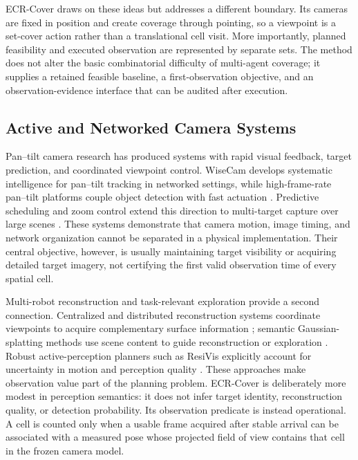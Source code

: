 ECR-Cover draws on these ideas but addresses a different boundary. Its cameras are fixed in position and create coverage through pointing, so a viewpoint is a set-cover action rather than a translational cell visit. More importantly, planned feasibility and executed observation are represented by separate sets. The method does not alter the basic combinatorial difficulty of multi-agent coverage; it supplies a retained feasible baseline, a first-observation objective, and an observation-evidence interface that can be audited after execution.

\subsection{Active and Networked Camera Systems}

Pan--tilt camera research has produced systems with rapid visual feedback, target prediction, and coordinated viewpoint control. WiseCam develops systematic intelligence for pan--tilt tracking in networked settings, while high-frame-rate pan--tilt platforms couple object detection with fast actuation \cite{e2024wisecam,jiang2021pan}. Predictive scheduling and zoom control extend this direction to multi-target capture over large scenes \cite{zhang2026capture}. These systems demonstrate that camera motion, image timing, and network organization cannot be separated in a physical implementation. Their central objective, however, is usually maintaining target visibility or acquiring detailed target imagery, not certifying the first valid observation time of every spatial cell.

Multi-robot reconstruction and task-relevant exploration provide a second connection. Centralized and distributed reconstruction systems coordinate viewpoints to acquire complementary surface information \cite{hardouin2023reconstruction}; semantic Gaussian-splatting methods use scene content to guide reconstruction or exploration \cite{zeng2025multirobot,nagami2026vista}. Robust active-perception planners such as ResiVis explicitly account for uncertainty in motion and perception quality \cite{xanthidis2024resivis}. These approaches make observation value part of the planning problem. ECR-Cover is deliberately more modest in perception semantics: it does not infer target identity, reconstruction quality, or detection probability. Its observation predicate is instead operational. A cell is counted only when a usable frame acquired after stable arrival can be associated with a measured pose whose projected field of view contains that cell in the frozen camera model.

